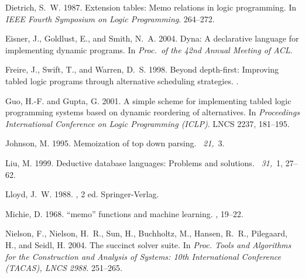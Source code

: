 \documentclass{tlp}
\begin{document}
\begin{thebibliography}{}
{\sc Dietrich, S.~W.} 1987.
\newblock Extension tables: Memo relations in logic programming.
\newblock In {\em IEEE Fourth Symposium on Logic Programming}. 264--272.

{\sc Eisner, J.}, {\sc Goldlust, E.}, {\sc and} {\sc Smith, N.~A.} 2004.
\newblock Dyna: A declarative language for implementing dynamic programs.
\newblock In {\em Proc.\ of the 42nd Annual Meeting of ACL}.

{\sc Freire, J.}, {\sc Swift, T.}, {\sc and} {\sc Warren, D.~S.} 1998.
\newblock Beyond depth-first: Improving tabled logic programs through
  alternative scheduling strategies.
.

{\sc Guo, H.-F.} {\sc and} {\sc Gupta, G.} 2001.
\newblock A simple scheme for implementing tabled logic programming systems
  based on dynamic reordering of alternatives.
\newblock In {\em Proceedings International Conference on Logic Programming
  (ICLP)}. LNCS 2237, 181--195.

{\sc Johnson, M.} 1995.
\newblock Memoization of top down parsing.
~{\em 21,\/}~3.

{\sc Liu, M.} 1999.
\newblock Deductive database languages: Problems and solutions.
~{\em 31,\/}~1, 27--62.

{\sc Lloyd, J.~W.} 1988.
, 2 ed.
\newblock Springer-Verlag.

{\sc Michie, D.} 1968.
\newblock ``memo'' functions and machine learning.
, 19--22.

{\sc Nielson, F.}, {\sc Nielson, H.~R.}, {\sc Sun, H.}, {\sc Buchholtz, M.},
  {\sc Hansen, R.~R.}, {\sc Pilegaard, H.}, {\sc and} {\sc Seidl, H.} 2004.
\newblock The succinct solver suite.
\newblock In {\em Proc. Tools and Algorithms for the Construction and Analysis
  of Systems: 10th International Conference (TACAS), LNCS 2988}. 251--265.


\end{thebibliography}
\end{document}
